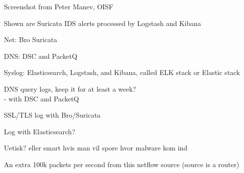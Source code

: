 \documentclass[Screen16to9,17pt]{foils}
\begin{document}


\begin{list2}
\item Screenshot from Peter Manev, OISF
\item Shown are Suricata IDS alerts processed by Logstash and Kibana
\end{list2}




\begin{list2}
\item Net: Bro  Suricata 
\item DNS: DSC and PacketQ 
\item Syslog: Elasticsearch, Logstash, and Kibana, called ELK stack or Elastic stack
\end{list2}




\begin{list2}
\item DNS query logs, keep it for at least a week?\\
- with DSC and PacketQ 
\item SSL/TLS log with Bro/Suricata\\
{\footnotesize{}}
\item Log with Elasticsearch?\\
{\footnotesize{}}
\end{list2}

\centerline{Uetisk? eller smart hvis man vil spore hvor malware kom ind}



\centerline{An extra 100k packets per second from this netflow source (source is a router)}
\end{document}
